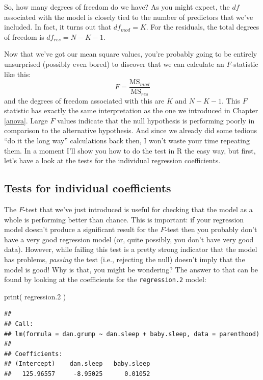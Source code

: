 \documentclass[
]{book}
\newenvironment{Shaded}{\begin{snugshade}}{\end{snugshade}}
\newcommand{\FloatTok}[1]{\textcolor[rgb]{0.00,0.00,0.81}{#1}}
\newcommand{\FunctionTok}[1]{\textcolor[rgb]{0.00,0.00,0.00}{#1}}
\newcommand{\NormalTok}[1]{#1}
\begin{document}
So, how many degrees of freedom do we have? As you might expect, the \(df\) associated with the model is closely tied to the number of predictors that we've included. In fact, it turns out that \(df_{mod} = K\). For the residuals, the total degrees of freedom is \(df_{res} = N -K - 1\).

Now that we've got our mean square values, you're probably going to be entirely unsurprised (possibly even bored) to discover that we can calculate an \(F\)-statistic like this:
\[
F =  \frac{\mbox{MS}_{mod}}{\mbox{MS}_{res}}
\]
and the degrees of freedom associated with this are \(K\) and \(N-K-1\). This \(F\) statistic has exactly the same interpretation as the one we introduced in Chapter \ref{anova}. Large \(F\) values indicate that the null hypothesis is performing poorly in comparison to the alternative hypothesis. And since we already did some tedious ``do it the long way'' calculations back then, I won't waste your time repeating them. In a moment I'll show you how to do the test in R the easy way, but first, let's have a look at the tests for the individual regression coefficients.

\hypertarget{tests-for-individual-coefficients}{%
\subsection{Tests for individual coefficients}\label{tests-for-individual-coefficients}}

The \(F\)-test that we've just introduced is useful for checking that the model as a whole is performing better than chance. This is important: if your regression model doesn't produce a significant result for the \(F\)-test then you probably don't have a very good regression model (or, quite possibly, you don't have very good data). However, while failing this test is a pretty strong indicator that the model has problems, \emph{passing} the test (i.e., rejecting the null) doesn't imply that the model is good! Why is that, you might be wondering? The answer to that can be found by looking at the coefficients for the \texttt{regression.2} model:

\begin{Shaded}
\begin{Highlighting}[]
\FunctionTok{print}\NormalTok{( regression}\FloatTok{.2}\NormalTok{ ) }
\end{Highlighting}
\end{Shaded}

\begin{verbatim}
## 
## Call:
## lm(formula = dan.grump ~ dan.sleep + baby.sleep, data = parenthood)
## 
## Coefficients:
## (Intercept)    dan.sleep   baby.sleep  
##   125.96557     -8.95025      0.01052
\end{verbatim}
\end{document}
